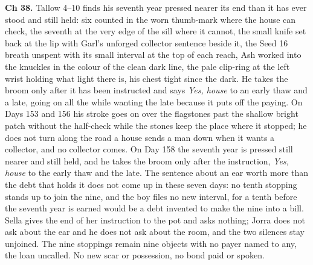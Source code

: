 \documentclass{design/chronicle}
\begin{document}
{\textbf{Ch 38.} Tallow 4–10 finds his seventh year pressed nearer its end than it has ever stood and still held: six counted in the worn thumb-mark where the house can check, the seventh at the very edge of the sill where it cannot, the small knife set back at the lip with Garl’s unforged collector sentence beside it, the Seed 16 breath unspent with its small interval at the top of each reach, Ash worked into the knuckles in the colour of the clean dark line, the pale clip-ring at the left wrist holding what light there is, his chest tight since the dark. He takes the broom only after it has been instructed and says \emph{Yes, house} to an early thaw and a late, going on all the while wanting the late because it puts off the paying. On Days 153 and 156 his stroke goes on over the flagstones past the shallow bright patch without the half-check while the stones keep the place where it stopped; he does not turn along the road a house sends a man down when it wants a collector, and no collector comes. On Day 158 the seventh year is pressed still nearer and still held, and he takes the broom only after the instruction, \emph{Yes, house} to the early thaw and the late. The sentence about an ear worth more than the debt that holds it does not come up in these seven days: no tenth stopping stands up to join the nine, and the boy files no new interval, for a tenth before the seventh year is earned would be a debt invented to make the nine into a bill. Sella gives the end of her instruction to the pot and asks nothing; Jorra does not ask about the ear and he does not ask about the room, and the two silences stay unjoined. The nine stoppings remain nine objects with no payer named to any, the loan uncalled. No new scar or possession, no bond paid or spoken.

}
\end{document}
